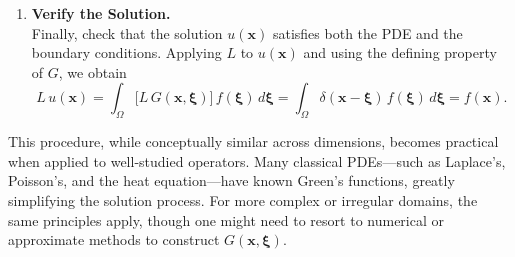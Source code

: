 \begin{enumerate}
    \item \textbf{Verify the Solution.}\\[1mm]
    Finally, check that the solution \(u(\mathbf{x})\) satisfies both the PDE and the boundary conditions. Applying \(L\) to \(u(\mathbf{x})\) and using the defining property of \(G\), we obtain
    \[
    L\,u(\mathbf{x}) = \int_{\Omega} \bigl[L\,G(\mathbf{x},\boldsymbol{\xi})\bigr]\,f(\boldsymbol{\xi})\,d\boldsymbol{\xi} = \int_{\Omega} \delta(\mathbf{x}-\boldsymbol{\xi})\,f(\boldsymbol{\xi})\,d\boldsymbol{\xi} = f(\mathbf{x}).
    \]
\end{enumerate}

\noindent
This procedure, while conceptually similar across dimensions, becomes practical when applied to well-studied operators. Many classical PDEs—such as Laplace's, Poisson's, and the heat equation—have known Green's functions, greatly simplifying the solution process. For more complex or irregular domains, the same principles apply, though one might need to resort to numerical or approximate methods to construct \(G(\mathbf{x},\boldsymbol{\xi})\).

